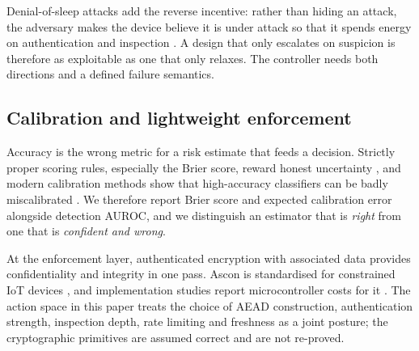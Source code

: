 Denial-of-sleep attacks add the reverse incentive: rather than hiding an attack,
the adversary makes the device believe it is under attack so that it spends
energy on authentication and inspection \cite{brownfield2005wireless,raymond2009effects}.
A design that only escalates on suspicion is therefore as exploitable as one
that only relaxes. The controller needs both directions and a defined failure
semantics.

\subsection{Calibration and lightweight enforcement}

Accuracy is the wrong metric for a risk estimate that feeds a decision. Strictly
proper scoring rules, especially the Brier score, reward honest uncertainty
\cite{gneiting2007strictly}, and modern calibration methods show that
high-accuracy classifiers can be badly miscalibrated \cite{guo2017calibration}.
We therefore report Brier score and expected calibration error alongside
detection AUROC, and we distinguish an estimator that is \emph{right} from one
that is \emph{confident and wrong}.

At the enforcement layer, authenticated encryption with associated data provides
confidentiality and integrity in one pass. Ascon is standardised for constrained
IoT devices \cite{dobraunig2021ascon}, and implementation studies report
microcontroller costs for it \cite{cagua2025implementation}. The action
space in this paper treats the choice of AEAD construction, authentication
strength, inspection depth, rate limiting and freshness as a joint posture; the
cryptographic primitives are assumed correct and are not re-proved.
